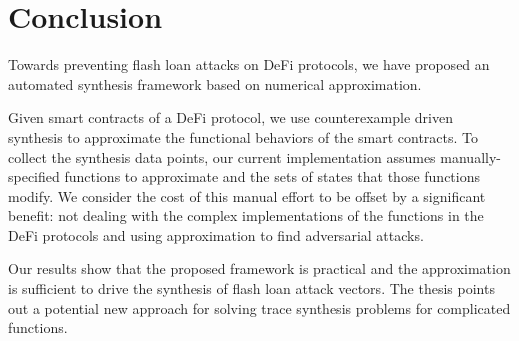 \chapter{Conclusion}
\label{sec:conclusion}

Towards preventing flash loan attacks on DeFi protocols, we have proposed an
automated synthesis framework based on numerical approximation. 

Given smart
contracts of a DeFi protocol, we use counterexample driven synthesis to approximate the
functional behaviors of the smart contracts. 
To collect the synthesis data
points, our current implementation assumes manually-specified functions to
approximate and the sets of states that those functions modify. We consider the
cost of this manual effort to be offset by a significant benefit: not dealing
with the complex implementations of the functions in the DeFi protocols and
using approximation to find adversarial attacks. 

Our results show that the proposed framework is practical and the approximation
is sufficient to drive the synthesis of flash loan attack vectors. The thesis
points out a potential new approach for solving trace
synthesis problems for complicated functions.
